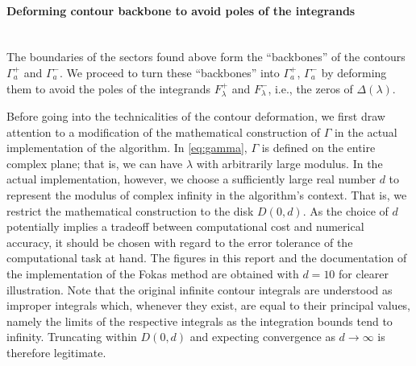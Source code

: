 \documentclass[12pt, oneside, a4paper]{article}
\begin{document}
\paragraph{Deforming contour backbone to avoid poles of the integrands}\label{sec:deform_contours}\mbox{}\\
The boundaries of the sectors found above form the ``backbones'' of the contours $\Gamma_a^+$ and $\Gamma_a^-$. We proceed to turn these ``backbones'' into $\Gamma_a^+$, $\Gamma_a^-$ by deforming them to avoid  the poles of the integrands $F^+_\lambda$ and $F^-_\lambda$, i.e., the zeros of $\Delta(\lambda)$. 

Before going into the technicalities of the contour deformation, we first draw attention to a modification of the mathematical construction of $\Gamma$ in the actual implementation of the algorithm. In \eqref{eq:gamma}, $\Gamma$ is defined on the entire complex plane; that is, we can have $\lambda$ with arbitrarily large modulus. In the actual implementation, however, we choose a sufficiently large real number $d$ to represent the modulus of complex infinity in the algorithm's context. That is, we restrict the mathematical construction to the disk $D(0, d)$. As the choice of $d$ potentially implies a tradeoff between computational cost and numerical accuracy, it should be chosen with regard to the error tolerance of the computational task at hand. The figures in this report and the documentation of the implementation of the Fokas method \cite{Xiao} are obtained with $d=10$ for clearer illustration. Note that the original infinite contour integrals are understood as improper integrals which, whenever they exist, are equal to their principal values, namely the limits of the respective integrals as the integration bounds tend to infinity. Truncating within $D(0,d)$ and expecting convergence as $d\to\infty$ is therefore legitimate.
\end{document}
